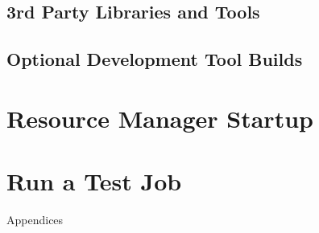 \documentclass[letterpaper]{article}
\begin{document}
\subsection{3rd Party Libraries and Tools} \label{sec:3rdparty}



\vspace*{0.1cm}


\subsection{Optional Development Tool Builds} \label{sec:3rdparty_intel}


\section{Resource Manager Startup} \label{sec:rms_startup}


\section{Run a Test Job} \label{sec:test_job}


\clearpage
\appendix
{\bf \LARGE \centerline{Appendices}} \vspace*{0.2cm}

\renewcommand{\thesubsection}{\Alph{subsection}}







\end{document}
